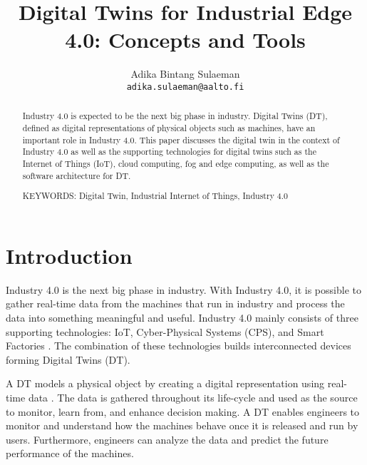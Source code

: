 \documentclass[article]{aaltoseries}
\begin{document}
 

\title{Digital Twins for Industrial Edge 4.0: Concepts and Tools}

\author{Adika Bintang Sulaeman%
\\\textnormal{\texttt{adika.sulaeman@aalto.fi}}} %


\maketitle


\begin{abstract}
  Industry 4.0 is expected to be the next big phase in industry. Digital Twins (DT), defined as digital representations of physical objects such as machines, have an important role in Industry 4.0. This paper discusses the digital twin in the context of Industry 4.0 as well as the supporting technologies for digital twins such as the Internet of Things (IoT), cloud computing, fog and edge computing, as well as the software architecture for DT.
  
\vspace{3mm}
\noindent KEYWORDS: Digital Twin, Industrial Internet of Things, Industry 4.0

\end{abstract}




\section{Introduction}

Industry 4.0 is the next big phase in industry. With Industry 4.0, it is possible to gather real-time data from the machines that run in industry and process the data into something meaningful and useful. Industry 4.0 mainly consists of three supporting technologies: IoT, Cyber-Physical Systems (CPS), and Smart Factories \cite{hermann2016design}. The combination of these technologies builds interconnected devices forming Digital Twins (DT).

A DT models a physical object by creating a digital representation using real-time data \cite{Cheatshe3:online}. The data is gathered throughout its life-cycle and used as the source to monitor, learn from, and enhance decision making. A DT enables engineers to monitor and understand how the machines behave once it is released and run by users. Furthermore, engineers can analyze the data and predict the future performance of the machines.
\end{document}
